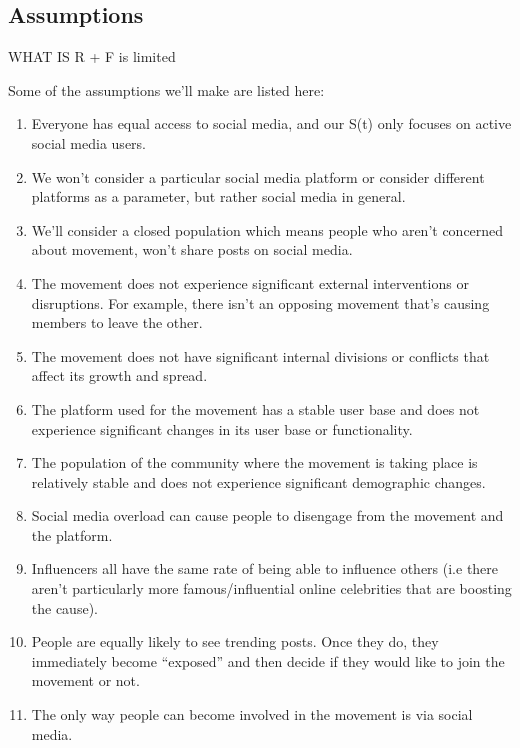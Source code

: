 \documentclass{article}
\begin{document}
    \subsection{Assumptions}
    WHAT IS R + F is limited
    
    Some of the assumptions we'll make are listed here:
    \begin{enumerate}
    \item  Everyone has equal access to social media, and our S(t) only focuses on active social media users.
    
    \item We won't consider a particular social media platform or consider different platforms as a parameter, but rather social media in general. 
    
    \item We'll consider a closed population which means people who aren't concerned about movement, won't share posts on social media. 
    
    \item The movement does not experience significant external interventions or disruptions. For example, there isn't an opposing movement that's causing members to leave the other. 
    
    \item The movement does not have significant internal divisions or conflicts that affect its growth and spread.
    
    \item The platform used for the movement has a stable user base and does not experience significant changes in its user base or functionality.

    \item The population of the community where the movement is taking place is relatively stable and does not experience significant demographic changes.

    \item Social media overload can cause people to disengage from the movement and the platform.

    \item Influencers all have the same rate of being able to influence others (i.e there aren’t particularly more famous/influential online celebrities that are boosting the cause). 

    \item People are equally likely to see trending posts. Once they do, they immediately become ``exposed'' and then decide if they would like to join the movement or not. 

    \item The only way people can become involved in the movement is via social media. 
    \end{enumerate}
\end{document}

